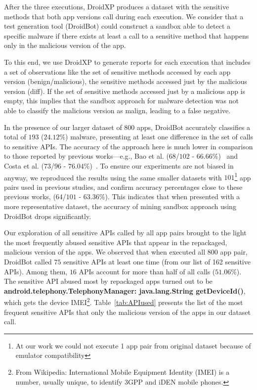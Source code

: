 After the three executions, DroidXP produces a dataset with the sensitive methods that both app versions call during each execution. We consider that a test
generation tool (DroidBot) could construct a sandbox able to detect a specific malware if there exists at least a call to a sensitive method that happens
only in the malicious version of the app. 

To this end, we use DroidXP to generate reports for each execution that includes a set of observations like the set of sensitive methods accessed by each app version (benign/malicious),
the sensitive methods accessed just by the malicious version (diff). If the set of sensitive methods accessed just by a malicious app is empty,
this implies that the sandbox approach for malware detection was not able to classify the malicious version as malign, leading to a false negative.

In the presence of our larger dataset of $800$ apps, DroidBot accurately classifies a total of $193$ ($24.12$\%) malware, presenting
at least one difference in the set of calls to sensitive APIs. The accuracy of the approach here is much lower in comparison to those reported by previous works---e.g.,
Bao et al. ($68$/$102$ - $66.66$\%)~\cite{DBLP:conf/wcre/BaoLL18} and Costa et al. ($73$/$96$ - $76.04$\%)~\cite{DBLP:journals/jss/CostaMMSSBNR22}. To ensure our experiments are not biased in anyway,
we reproduced the results using the same smaller datasets with $101$\footnote{At our work we could not execute 1 app pair from original dataset because of emulator compatibility} app pairs used in previous studies, and confirm accuracy percentages close to these previous works, ($64$/$101$ - $63.36$\%).
This indicates that when presented with a more representative dataset, the accuracy of mining sandbox approach using DroidBot drops significantly. 

Our exploration of all sensitive APIs called by all app pairs brought to the light the most frequently abused sensitive APIs that
appear in the repackaged, malicious version of the apps. We observed that when executed all 800 app pair, DroidBot called $75$ sensitive APIs at least one time (from our list of 162 sensitive APIs). Among them, $16$ APIs account for more than half of all calls ($51.06$\%).
The sensitive API abused most by repackaged apps turned out to be \textbf{android.telephony.TelephonyManager: java.lang.String getDeviceId()}, which gets the device
IMEI\footnote{From Wikipedia: International Mobile Equipment Identity (IMEI) is a number, usually unique, to identify 3GPP and iDEN mobile phones.}.
Table~\ref{tab:APIused} presents the list of the most frequent sensitive APIs that only the malicious
version of the apps in our dataset call.

